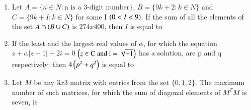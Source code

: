 \documentclass[journal,12pt,twocolumn]{IEEEtran}
\theoremstyle{remark}
\begin{document}
\begin{enumerate}
\bigskip
\item Let $A=\{n\in N: \text{n is a 3-digit number}\}$, $B=\{9k+2: k\in N\}$ and $C=\{9k+I:k\in N\}$ for some I $\left(0<I<9\right)$. If the sum of all the elements of the set $A\cap\left(B\cup C\right)$ is $274 x 400$, then $I$ is equal to 
\bigskip
\item If the least and the largest real values of $\alpha$, for which the equation $z+\alpha|z-1|+2i=0$ $\left(z \in\text{C and i}=\sqrt{-1}\right)$ has a solution, are p and q respectively; then $4\left(p^2+q^2\right)$ is equal to 
\bigskip
\item Let $M$ be any $3 x 3 $ matrix with entries from the set $\{0,1,2\}$. The maximum number of such matrices, for which the sum of diagonal elements of $M^TM$ is seven, is 
\bigskip
\end{enumerate}
\end{document}

